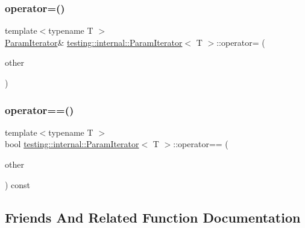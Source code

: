 \subsubsection{\texorpdfstring{operator=()}{operator=()}}
{\footnotesize\ttfamily template$<$typename T $>$ \\
\mbox{\hyperlink{classtesting_1_1internal_1_1ParamIterator}{Param\+Iterator}}\& \mbox{\hyperlink{classtesting_1_1internal_1_1ParamIterator}{testing\+::internal\+::\+Param\+Iterator}}$<$ T $>$\+::operator= (\begin{DoxyParamCaption}\item[{const \mbox{\hyperlink{classtesting_1_1internal_1_1ParamIterator}{Param\+Iterator}}$<$ T $>$ \&}]{other }\end{DoxyParamCaption})\hspace{0.3cm}{\ttfamily [inline]}}

\mbox{\label{classtesting_1_1internal_1_1ParamIterator_adc356b4789eb0c2a1b5b033c7874e5a6}} 
\subsubsection{\texorpdfstring{operator==()}{operator==()}}
{\footnotesize\ttfamily template$<$typename T $>$ \\
bool \mbox{\hyperlink{classtesting_1_1internal_1_1ParamIterator}{testing\+::internal\+::\+Param\+Iterator}}$<$ T $>$\+::operator== (\begin{DoxyParamCaption}\item[{const \mbox{\hyperlink{classtesting_1_1internal_1_1ParamIterator}{Param\+Iterator}}$<$ T $>$ \&}]{other }\end{DoxyParamCaption}) const\hspace{0.3cm}{\ttfamily [inline]}}



\subsection{Friends And Related Function Documentation}
\mbox{\label{classtesting_1_1internal_1_1ParamIterator_ab73a355ae191f2f7eab54b65ca557714}} 
